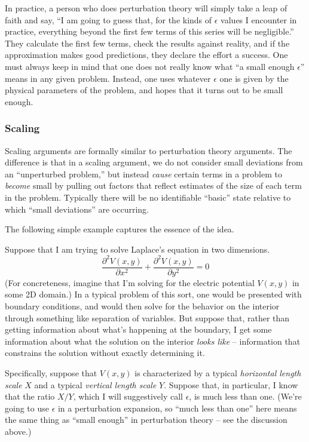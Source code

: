 \documentclass[11pt]{book}
\begin{document}
In practice, a person who does perturbation theory will simply take a leap of faith and say, ``I am going to guess that, for the kinds of $\epsilon$ values I encounter in practice, everything beyond the first few terms of this series will be negligible.''  They calculate the first few terms, check the results against reality, and if the approximation makes good predictions, they declare the effort a success.  One must always keep in mind that one does not really know what ``a small enough $\epsilon$'' means in any given problem.  Instead, one uses whatever $\epsilon$ one is given by the physical parameters of the problem, and hopes that it turns out to be small enough.
\subsubsection{Scaling}
Scaling arguments are formally similar to perturbation theory arguments.  The difference is that in a scaling argument, we do not consider small deviations from an ``unperturbed problem,'' but instead \emph{cause} certain terms in a problem to \emph{become} small by pulling out factors that reflect estimates of the size of each term in the problem.  Typically there will be no identifiable ``basic'' state relative to which ``small deviations'' are occurring.

The following simple example captures the essence of the idea.

Suppose that I am trying to solve Laplace's equation in two dimensions.
\begin{equation}\frac{\partial^2 V(x,y)}{\partial x^2} + \frac{\partial^2 V(x,y)}{\partial y^2} = 0\label{laplace1}\end{equation}
(For concreteness, imagine that I'm solving for the electric potential $V(x,y)$ in some 2D domain.)  In a typical problem of this sort, one would be presented with boundary conditions, and would then solve for the behavior on the interior through something like separation of variables.  But suppose that, rather than getting information about what's happening at the boundary, I get some information about what the solution on the interior \emph{looks like} -- information that constrains the solution without exactly determining it.

Specifically, suppose that $V(x,y)$ is characterized by a typical \emph{horizontal length scale} $X$ and a typical \emph{vertical length scale} $Y$.  Suppose that, in particular, I know that the ratio $X/Y$, which I will suggestively call $\epsilon$, is much less than one.  (We're going to use $\epsilon$ in a perturbation expansion, so ``much less than one'' here means the same thing as ``small enough'' in perturbation theory -- see the discussion above.)
\end{document}
